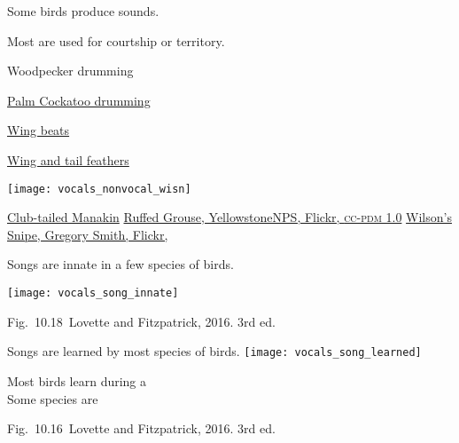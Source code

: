 \documentclass[t]{beamer}
\newcommand{\cornell}[1]{Fig.~#1~Lovette and Fitzpatrick, 2016. 3rd ed.}
\begin{document}
\begin{frame}{Some birds produce  sounds.}

\begin{multicols}{2}

Most are used for courtship or territory.

\hangpara Woodpecker drumming

\hangpara \href{https://www.youtube.com/watch?v=2MIoXh_ORMw}{Palm Cockatoo drumming}

\hangpara \href{https://www.youtube.com/watch?v=9BrJghW-WEk}{Wing beats}

\hangpara \href{https://youtu.be/-_1pyFEYptI}{Wing and tail feathers}

\columnbreak

\centering

\noindent {}

\smallskip

\noindent\texttt{[image: vocals\_nonvocal\_wisn]}

\end{multicols}

\vfilll

\tiny \href{https://www.youtube.com/watch?v=tSHjhCN6NC0}{Club-tailed Manakin} 
\hfill
\href{https://www.flickr.com/photos/80223459@N05/15116108746}{Ruffed Grouse, YellowstoneNPS, Flickr, \textsc{cc-pdm 1.0}}
\hfill
\href{https://www.flickr.com/photos/22170893@N06/11635736575}{Wilson's Snipe, Gregory Smith, Flickr, }

\end{frame}


\begin{frame}{Songs are innate in a few species of birds.}

\texttt{[image: vocals\_song\_innate]}

\vfilll

\tinyfill \cornell{10.18}
\end{frame}


\begin{frame}{Songs are learned by most species of birds.}
\texttt{[image: vocals\_song\_learned]}

\hangpara Most birds learn during a \\ Some species are 

\vfilll

\tinyfill \cornell{10.16}
\end{frame}
\end{document}
